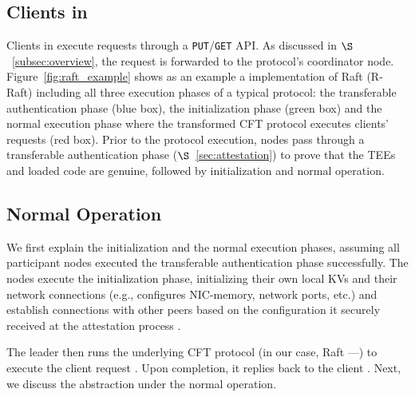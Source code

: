 
\subsection{Clients in \projecttitle{}}
Clients in \projecttitle{} execute requests through a \texttt{PUT}/\texttt{GET} API. As discussed in $\S$~\ref{subsec:overview}, the request is forwarded to the protocol's coordinator node. Figure~\ref{fig:raft_example} shows as an example a \projecttitle{} implementation of Raft (R-Raft) including all three execution phases of a typical \projecttitle{} protocol: the transferable authentication phase (blue box), the initialization phase (green box) and the normal execution phase where the transformed CFT protocol executes clients' requests (red box). Prior to the protocol execution, nodes pass through a transferable authentication phase ($\S$~\ref{sec:attestation}) to prove that the TEEs and loaded code are genuine, followed by initialization and normal operation. 











\subsection{Normal Operation}
\label{sec:normal_operation}

We first explain the initialization and the normal execution phases, assuming all participant nodes executed the transferable authentication phase successfully.
The nodes execute the initialization phase, initializing their own local KVs  and their network connections (e.g., configures NIC-memory, network ports, etc.) and establish connections with other peers  based on the configuration it securely received at the attestation process . 




The leader then runs the underlying CFT protocol (in our case, Raft ---) to execute the client request . Upon completion, it replies back to the client . Next, we discuss the \projecttitle{} abstraction under the normal operation. 



